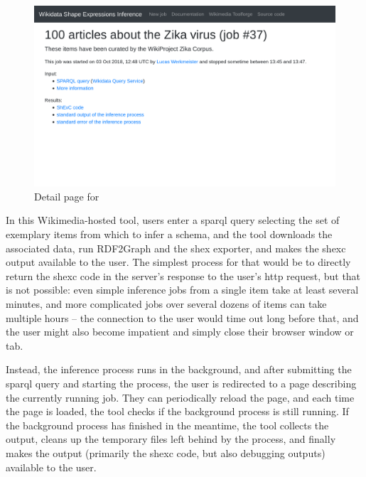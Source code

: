 \begin{figure}
  \includegraphics[width=\textwidth]{screenshots/wdsi-zika}
  \caption{Detail page for }
  \label{fig:wdsi-zika}
\end{figure}

In this \gls{Wikimedia}-hosted tool,
users enter a \gls{sparql} query selecting the set of exemplary \glspl{item} from which to infer a \gls{schema},
and the tool downloads the associated data,
run \gls{RDF2Graph} and the \gls{shex} exporter,
and makes the \gls{shexc} output available to the user.
The simplest process for that would be
to directly return the \gls{shexc} code in the server’s response to the user’s \gls{http} request,
but that is not possible:
even simple inference \glspl{job}
from a single \gls{item} take at least several minutes,
and more complicated \glspl{job}
over several dozens of \glspl{item} can take multiple hours –
the connection to the user would time out long before that,
and the user might also become impatient and simply close their browser window or tab.

Instead, the inference process runs in the background,
and after submitting the \gls{sparql} query and starting the process,
the user is redirected to a page describing the currently running \gls{job}.
They can periodically reload the page,
and each time the page is loaded,
the tool checks if the background process is still running.
If the background process has finished in the meantime,
the tool collects the output,
cleans up the temporary files left behind by the process,
and finally makes the output
(primarily the \gls{shexc} code, but also debugging outputs)
available to the user.

